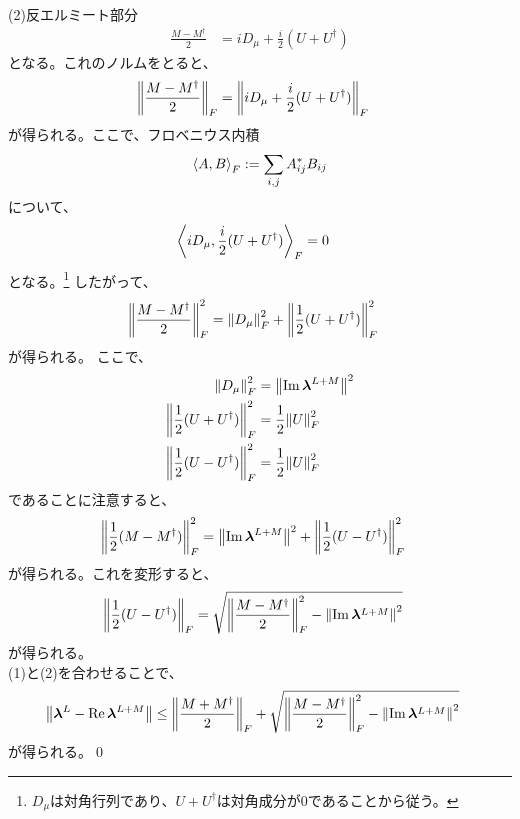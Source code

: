 \documentclass[a4paper,11pt]{jsarticle}
\numberwithin{equation}{section}
\begin{document}
(2)反エルミート部分\\
\begin{align}
    \frac{M - M^{\dagger}}{2} &= iD_{\mu} + \frac{i}{2}(U+U^{\dagger})
\end{align}
となる。これのノルムをとると、
\begin{align}
    \norm{\frac{M - M^{\dagger}}{2}}_F &= \norm{iD_{\mu} + \frac{i}{2}(U+U^{\dagger})}_F
\end{align}
が得られる。ここで、フロベニウス内積
\begin{align}
    \ev{A, B}_F := \sum_{i,j} A_{ij}^* B_{ij}
\end{align}
について、
\begin{align}
    \ev{iD_{\mu}, \frac{i}{2}(U+U^{\dagger})}_F &=0
\end{align}
となる。\footnote{
    $D_{\mu}$は対角行列であり、$U+U^{\dagger}$は対角成分が$0$であることから従う。
}
したがって、
\begin{align}
    \norm{\frac{M - M^{\dagger}}{2}}_F^2 &= \norm{D_{\mu}}_F^2 + \norm{\frac{1}{2}(U+U^{\dagger})}_F^2
\end{align}
が得られる。
ここで、
\begin{align}
    \norm{D_{\mu}}_F^2 &= \norm{\Im \bm{\lambda}^{L + M}}^2\\
    \norm{\frac{1}{2}(U+U^{\dagger})}_F^2 &= \frac{1}{2} \norm{U}_F^2\\
    \norm{\frac{1}{2}(U-U^{\dagger})}_F^2 &= \frac{1}{2} \norm{U}_F^2
\end{align}
であることに注意すると、
\begin{align}
    \norm{\frac{1}{2}(M-M^{\dagger})}_F^2 &= \norm{\Im \bm{\lambda}^{L + M}}^2 + \norm{\frac{1}{2}(U-U^{\dagger})}_F^2
\end{align}
が得られる。これを変形すると、
\begin{align}
    \norm{\frac{1}{2}(U-U^{\dagger})}_F &= \sqrt{\norm{\frac{M - M^{\dagger}}{2}}_F^2 - \norm{\Im \bm{\lambda}^{L + M}}^2}
\end{align}
が得られる。\\

(1)と(2)を合わせることで、
\begin{align}
    \norm{\bm{\lambda}^L - \Re \bm{\lambda}^{L + M}} &\leq 
    \norm{\frac{M + M^{\dagger}}{2}}_F+ \sqrt{\norm{\frac{M - M^{\dagger}}{2}}_F^2 - \norm{\Im \bm{\lambda}^{L + M}}^2}
\end{align}
が得られる。\qed\\
\end{document}
